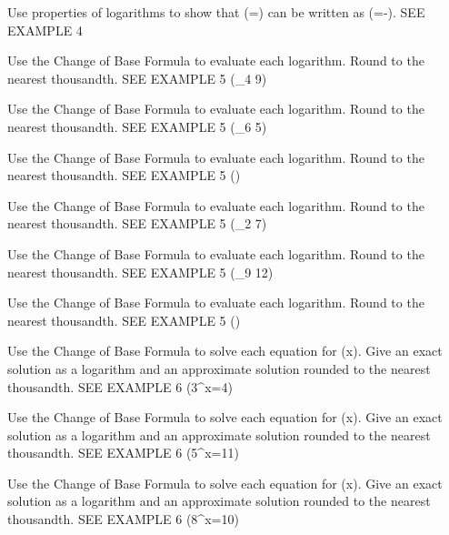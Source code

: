 \documentclass{article}
\newenvironment{practice}[2]{}{}        %
\newcommand{\answer}[1]{}               %
\begin{document}
\begin{practice}{23}{2}
Use properties of logarithms to show that (=\log{}) can be written as (=-\log[H^+]). SEE EXAMPLE 4
\answer{(\mathrm{pH}=\log(\frac{1}{[H^+]})=\log1-\log[H^+]=0-\log[H^+]=-\log[H^+])}
\end{practice}
\begin{practice}{24}{1}
Use the Change of Base Formula to evaluate each logarithm. Round to the nearest thousandth. SEE EXAMPLE 5
(\log_4 9)
\answer{1.585}
\end{practice}
\begin{practice}{25}{1}
Use the Change of Base Formula to evaluate each logarithm. Round to the nearest thousandth. SEE EXAMPLE 5
(\log_6 5)
\answer{0.898}
\end{practice}
\begin{practice}{26}{1}
Use the Change of Base Formula to evaluate each logarithm. Round to the nearest thousandth. SEE EXAMPLE 5
()
\answer{1.099}
\end{practice}
\begin{practice}{27}{1}
Use the Change of Base Formula to evaluate each logarithm. Round to the nearest thousandth. SEE EXAMPLE 5
(\log_2 7)
\answer{2.807}
\end{practice}
\begin{practice}{28}{1}
Use the Change of Base Formula to evaluate each logarithm. Round to the nearest thousandth. SEE EXAMPLE 5
(\log_9 12)
\answer{1.131}
\end{practice}
\begin{practice}{29}{1}
Use the Change of Base Formula to evaluate each logarithm. Round to the nearest thousandth. SEE EXAMPLE 5
()
\answer{3.135}
\end{practice}
\begin{practice}{30}{1}
Use the Change of Base Formula to solve each equation for (x). Give an exact solution as a logarithm and an approximate solution rounded to the nearest thousandth. SEE EXAMPLE 6
(3^x=4)
\answer{(\frac{\log4}{\log3}); 1.262}
\end{practice}
\begin{practice}{31}{1}
Use the Change of Base Formula to solve each equation for (x). Give an exact solution as a logarithm and an approximate solution rounded to the nearest thousandth. SEE EXAMPLE 6
(5^x=11)
\answer{(\frac{\log11}{\log5}); 1.490}
\end{practice}
\begin{practice}{32}{1}
Use the Change of Base Formula to solve each equation for (x). Give an exact solution as a logarithm and an approximate solution rounded to the nearest thousandth. SEE EXAMPLE 6
(8^x=10)
\answer{(\frac{\log10}{\log8}); 1.107}
\end{practice}
\end{document}
